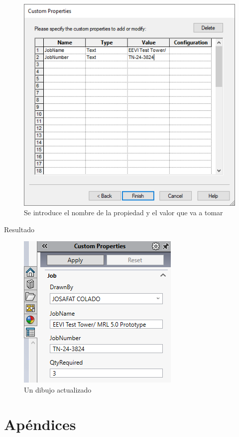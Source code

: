 \documentclass[12pt,letterpaper,final]{report}
\begin{document}
\begin{figure}[H]
	\centering
	\includegraphics[width=0.65\linewidth, height=0.35\textheight,keepaspectratio]{Imagenes/solidworks_updatecustomprop03}
	\caption{Se introduce el nombre de la propiedad y el valor que va a tomar}
	\label{fig:solidworksupdatecustomprop03}
\end{figure}

\clearpage

{\LARGE Resultado}

\begin{figure}[H]
	\centering
	\includegraphics[width=0.55\linewidth, height=0.35\textheight,keepaspectratio]{Imagenes/solidworks_updatecustomprop04}
	\caption{Un dibujo actualizado}
	\label{fig:solidworksupdatecustomprop04}
\end{figure}

\part{Apéndices}

\appendix
\end{document}
